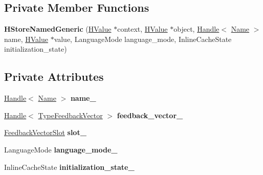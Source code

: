 \subsection*{Private Member Functions}
\begin{DoxyCompactItemize}
\item 
{\bfseries H\+Store\+Named\+Generic} (\hyperlink{classv8_1_1internal_1_1_h_value}{H\+Value} $\ast$context, \hyperlink{classv8_1_1internal_1_1_h_value}{H\+Value} $\ast$object, \hyperlink{classv8_1_1internal_1_1_handle}{Handle}$<$ \hyperlink{classv8_1_1internal_1_1_name}{Name} $>$ name, \hyperlink{classv8_1_1internal_1_1_h_value}{H\+Value} $\ast$value, Language\+Mode language\+\_\+mode, Inline\+Cache\+State initialization\+\_\+state)\hypertarget{classv8_1_1internal_1_1_h_store_named_generic_ac234ffdc1a23b3a1fc3e9e5f4331779b}{}\label{classv8_1_1internal_1_1_h_store_named_generic_ac234ffdc1a23b3a1fc3e9e5f4331779b}

\end{DoxyCompactItemize}
\subsection*{Private Attributes}
\begin{DoxyCompactItemize}
\item 
\hyperlink{classv8_1_1internal_1_1_handle}{Handle}$<$ \hyperlink{classv8_1_1internal_1_1_name}{Name} $>$ {\bfseries name\+\_\+}\hypertarget{classv8_1_1internal_1_1_h_store_named_generic_a1487741ff7006ad35f4485cf289a54ca}{}\label{classv8_1_1internal_1_1_h_store_named_generic_a1487741ff7006ad35f4485cf289a54ca}

\item 
\hyperlink{classv8_1_1internal_1_1_handle}{Handle}$<$ \hyperlink{classv8_1_1internal_1_1_type_feedback_vector}{Type\+Feedback\+Vector} $>$ {\bfseries feedback\+\_\+vector\+\_\+}\hypertarget{classv8_1_1internal_1_1_h_store_named_generic_a03f7eb48f30575aa957524a8fdbc43dd}{}\label{classv8_1_1internal_1_1_h_store_named_generic_a03f7eb48f30575aa957524a8fdbc43dd}

\item 
\hyperlink{classv8_1_1internal_1_1_feedback_vector_slot}{Feedback\+Vector\+Slot} {\bfseries slot\+\_\+}\hypertarget{classv8_1_1internal_1_1_h_store_named_generic_a0dcc488f7df20ea8d562e11f801ba9de}{}\label{classv8_1_1internal_1_1_h_store_named_generic_a0dcc488f7df20ea8d562e11f801ba9de}

\item 
Language\+Mode {\bfseries language\+\_\+mode\+\_\+}\hypertarget{classv8_1_1internal_1_1_h_store_named_generic_a437a7ba3dc1053ad6f7db15ebb445591}{}\label{classv8_1_1internal_1_1_h_store_named_generic_a437a7ba3dc1053ad6f7db15ebb445591}

\item 
Inline\+Cache\+State {\bfseries initialization\+\_\+state\+\_\+}\hypertarget{classv8_1_1internal_1_1_h_store_named_generic_a10c7f3410f7c62105747d746cc3ca933}{}\label{classv8_1_1internal_1_1_h_store_named_generic_a10c7f3410f7c62105747d746cc3ca933}

\end{DoxyCompactItemize}

